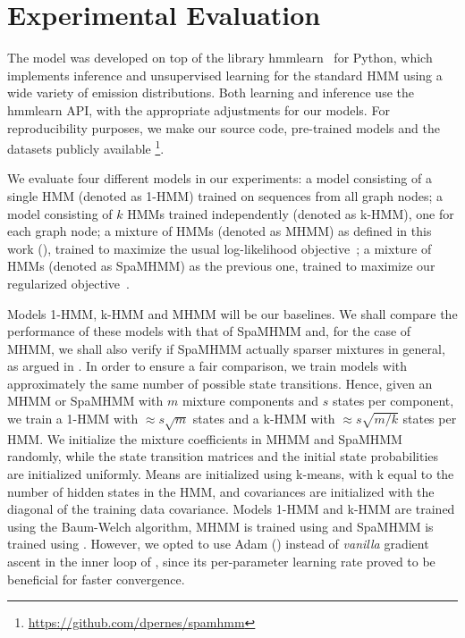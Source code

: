 \section{Experimental Evaluation}
\label{sec:experiments}
The model was developed on top of the library hmmlearn~\citet{hmmlearn} for Python, which implements inference and unsupervised learning for the standard HMM using a wide variety of emission distributions. Both learning and inference use the hmmlearn API, with the appropriate adjustments for our models. For reproducibility purposes, we make our source code, pre-trained models and the datasets publicly available \footnote{\url{https://github.com/dpernes/spamhmm}}.

We evaluate four different models in our experiments: a model consisting of a single HMM (denoted as 1-HMM) trained on sequences from all graph nodes; a model consisting of $k$ HMMs trained independently (denoted as k-HMM), one for each graph node; a mixture of HMMs (denoted as MHMM) as defined in this work (), trained to maximize the usual log-likelihood objective~; a mixture of HMMs (denoted as SpaMHMM) as the previous one, trained to maximize our regularized objective~.

Models 1-HMM, k-HMM and MHMM will be our baselines. We shall compare the performance of these models with that of SpaMHMM and, for the case of MHMM, we shall also verify if SpaMHMM actually sparser mixtures in general, as argued in . In order to ensure a fair comparison, we train models with approximately the same number of possible state transitions. Hence, given an MHMM or SpaMHMM with $m$ mixture components and $s$ states per component, we train a 1-HMM with $\approx s\sqrt{m}$ states and a k-HMM with $\approx s\sqrt{m/k}$ states per HMM. We initialize the mixture coefficients in MHMM and SpaMHMM randomly, while the state transition matrices and the initial state probabilities are initialized uniformly. Means are initialized using k-means, with k equal to the number of hidden states in the HMM, and covariances are initialized with the diagonal of the training data covariance. Models 1-HMM and k-HMM are trained using the Baum-Welch algorithm, MHMM is trained using  and SpaMHMM is trained using . However, we opted to use Adam (\citet{Kingma2014}) instead of \textit{vanilla} gradient ascent in the inner loop of , since its per-parameter learning rate proved to be beneficial for faster convergence.

